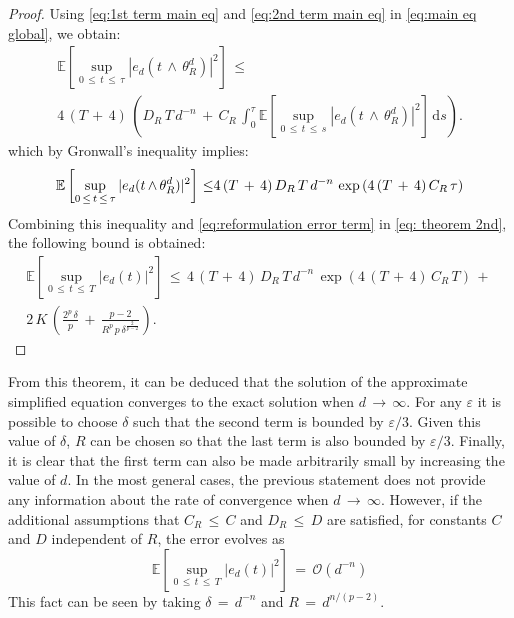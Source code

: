 \begin{proof}
    Using \eqref{eq:1st term main eq} and \eqref{eq:2nd term main eq} in
    \eqref{eq:main eq global}, we obtain:
    \begin{multline*}
        \mathbb E \left[ \sup_{0\, {\leq} \,t\, {\leq} \,{\tau}} |e_d(t\,{\wedge}\,{\theta}_R^d)|^2\right]\, {\leq} \,\\
        4\,(T\,+\,4)\,\left(D_R\,T \,d^{-n}\,+\,C_R\,{\int}_0^{{\tau}}\mathbb
            E\left[\sup_{0\, {\leq} \,t\, {\leq} \,s}|e_d(t \,{\wedge}\, {\theta}_R^d)|^2\right]\,\mathrm ds\right).
    \end{multline*}
    which by Gronwall's inequality implies:
    \begin{equation}
        \mathbb E \left[ \sup_{0\, {\leq} \,t\, {\leq} \,{\tau}} |e_d(t\,{\wedge}\,{\theta}_R^d)|^2\right]\, {\leq} \,\\
        4\,(T\,+\,4)\,D_R\,T\,d^{-n}\,\exp \left(4\,(T\,+\,4)\,C_R\, {\tau}\right)
    \end{equation}
    Combining this inequality and \eqref{eq:reformulation error term} in \eqref{eq:
        theorem 2nd}, the following bound is obtained:
    \begin{multline}
        \mathbb E \left[\sup_{0\, {\leq} \,t\, {\leq} \,T} |e_d(t)|^2 \right]
        \, {\leq} \,4\,(T\,+\,4)\,D_R\,T\,d^{-n}\,\exp \left(4\,(T\,+\,4)\,C_R\, T\right)
        \,+\, \\ 2\,K\,
        \left(\frac{2^p\,{\delta}}{p}\,+\,\frac{p-2}{R^p\,p\,{\delta}^{\frac{2}{p-2}}}\right).
        \label{eq: theorem 2nd}        
    \end{multline}
\end{proof}
\noindent From this theorem, it can be deduced that the solution of the approximate
simplified equation converges to the exact solution when $d\,\to\,{\infty}$. For any ${\varepsilon}$ it
is possible to choose ${\delta}$ such that the second term is bounded by
${\varepsilon}/3$. Given this value of ${\delta}$, $R$ can be chosen so that the last
term is also bounded by ${\varepsilon}/3$. Finally, it is clear that the first term can also
be made arbitrarily small by increasing the value of $d$.  In the most general
cases, the previous statement does not provide any information about the rate
of convergence when $d\,\to\,{\infty}$. However, if the additional assumptions
that $C_R\, {\leq} \,C$ and  $D_R\, {\leq} \,D$ are satisfied, for constants
$C$ and $D$ independent of $R$, the error evolves as
$$
\mathbb E \left[\sup_{0\, {\leq} \,t\, {\leq} \,T} |e_d(t)|^2 \right]\,=\,\mathcal O(d^{-n})
$$
This fact can be seen by taking ${\delta}\,=\, d^{-n}$ and $R\,=\,d^{n/(p-2)}$.
